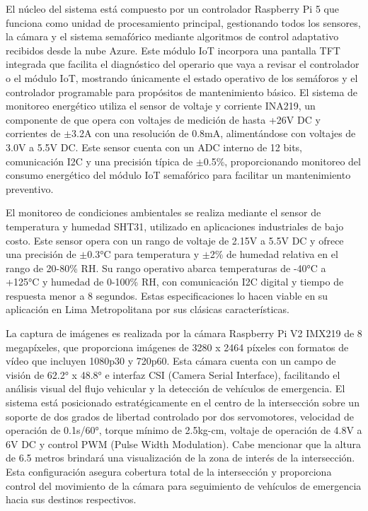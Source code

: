 \documentclass[12pt,a4paper,oneside]{report}
\begin{document}
El núcleo del sistema está compuesto por un controlador Raspberry Pi 5 que funciona como unidad de procesamiento principal, gestionando todos los sensores, la cámara y el sistema semafórico mediante algoritmos de control adaptativo recibidos desde la nube Azure. Este módulo IoT incorpora una pantalla TFT integrada que facilita el diagnóstico del operario que vaya a revisar el controlador o el módulo IoT, mostrando únicamente el estado operativo de los semáforos y el controlador programable para propósitos de mantenimiento básico. El sistema de monitoreo energético utiliza el sensor de voltaje y corriente INA219, un componente de que opera con voltajes de medición de hasta +26V DC y corrientes de \ensuremath{\pm}3.2A con una resolución de 0.8mA, alimentándose con voltajes de 3.0V a 5.5V DC. Este sensor cuenta con un ADC interno de 12 bits, comunicación I2C y una precisión típica de \ensuremath{\pm}0.5\%, proporcionando monitoreo del consumo energético del módulo IoT semafórico para facilitar un mantenimiento preventivo.

El monitoreo de condiciones ambientales se realiza mediante el sensor de temperatura y humedad SHT31, utilizado en aplicaciones industriales de bajo costo. Este sensor opera con un rango de voltaje de 2.15V a 5.5V DC y ofrece una precisión de \ensuremath{\pm}0.3°C para temperatura y \ensuremath{\pm}2\% de humedad relativa en el rango de 20-80\% RH. Su rango operativo abarca temperaturas de -40°C a +125°C y humedad de 0-100\% RH, con comunicación I2C digital y tiempo de respuesta menor a 8 segundos. Estas especificaciones lo hacen viable en su aplicación en Lima Metropolitana por sus clásicas características.

La captura de imágenes es realizada por la cámara Raspberry Pi V2 IMX219 de 8 megapíxeles, que proporciona imágenes de 3280 x 2464 píxeles con formatos de vídeo que incluyen 1080p30 y 720p60. Esta cámara cuenta con un campo de visión de 62.2° x 48.8° e interfaz CSI (Camera Serial Interface), facilitando el análisis visual del flujo vehicular y la detección de vehículos de emergencia. El sistema está posicionado estratégicamente en el centro de la intersección sobre un soporte de dos grados de libertad controlado por dos servomotores, velocidad de operación de 0.1s/60°, torque mínimo de 2.5kg-cm, voltaje de operación de 4.8V a 6V DC y control PWM (Pulse Width Modulation). Cabe mencionar que la altura de 6.5 metros brindará una visualización de la zona de interés de la intersección. Esta configuración asegura cobertura total de la intersección y proporciona control del movimiento de la cámara para seguimiento de vehículos de emergencia hacia sus destinos respectivos.
\end{document}
